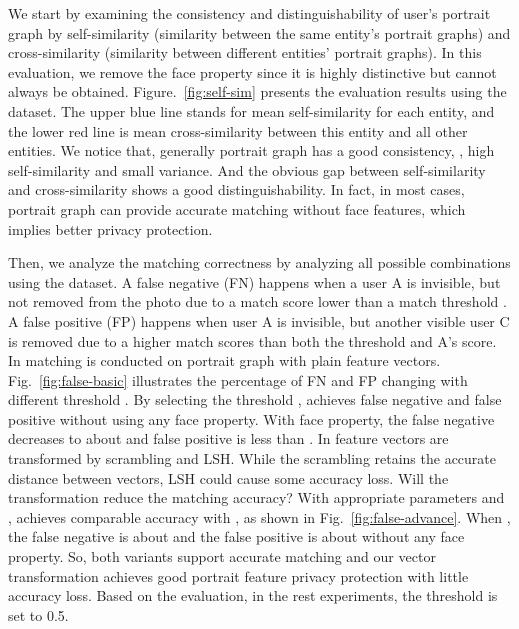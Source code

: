 We start by examining the consistency and distinguishability of user's
portrait graph
 by self-similarity (similarity between the same entity's portrait graphs)
 and cross-similarity (similarity between different entities' portrait graphs).
In this evaluation, we remove the face property since it is highly distinctive
 but cannot always be obtained.
Figure.~\ref{fig:self-sim} presents the evaluation results using the dataset.
The upper blue line stands for mean self-similarity for each entity,
 and the lower red line is mean cross-similarity between this entity
 and all other entities.
We notice that, generally portrait graph has a good consistency, \ie,
high self-similarity and small variance.
And the obvious gap between self-similarity and cross-similarity
 shows a good distinguishability.
In fact, in most cases, portrait graph can provide accurate matching
 without face features,  which implies better privacy protection.


Then, we analyze the matching correctness by analyzing all possible combinations using the dataset.
A false negative (FN) happens when a user A is invisible, but not removed from the photo
due to a match score lower than a match threshold .
A false positive (FP) happens when user A is invisible, but another visible user C is removed due to
 a higher match scores than both the threshold and A's score.
In \basic matching is conducted on portrait graph with plain feature vectors.
Fig.~\ref{fig:false-basic} illustrates the  percentage of
FN and FP changing with different threshold .
By selecting the threshold ,
 \basic achieves  false negative and  false
 positive without using any face property.
With face property, the false negative decreases to about  and
false positive is less than .
In \advanced feature vectors are transformed by scrambling and LSH.
While the scrambling retains the accurate distance between vectors,
LSH could cause some accuracy loss.
Will the transformation reduce the matching accuracy?
With appropriate parameters  and ,
\advanced achieves comparable accuracy with \basic, as shown in
Fig.~\ref{fig:false-advance}.
When  ,
 the false negative is about  and the false positive is about
  without any face property.
So, both variants support accurate matching and our vector transformation achieves good portrait feature privacy
 protection with little accuracy loss.
Based on the evaluation, in the rest experiments,
 the threshold  is set to 0.5.















